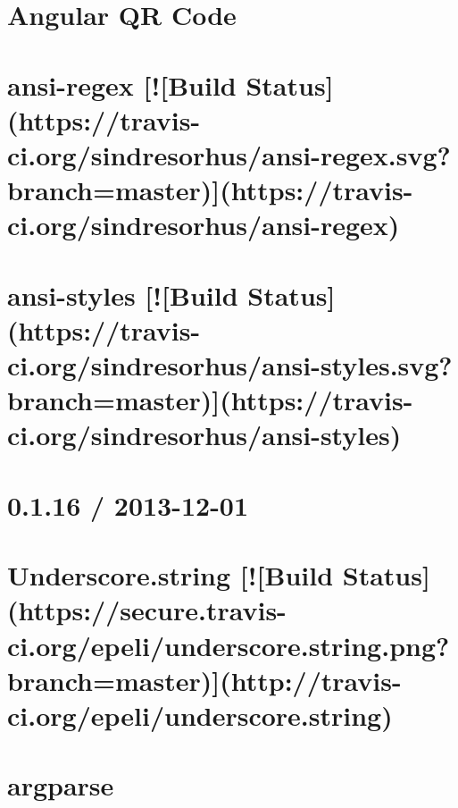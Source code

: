 \documentclass[twoside]{book}
\newcommand{\+}{\discretionary{\mbox{\scriptsize$\hookleftarrow$}}{}{}}
\begin{document}
\chapter{Angular QR Code}
\label{md_app_web_node_modules_angular-qrcode__r_e_a_d_m_e}

\chapter{ansi-\/regex \mbox{[}!\mbox{[}Build Status\mbox{]}(https\+://travis-\/ci.org/sindresorhus/ansi-\/regex.svg?branch=master)\mbox{]}(https\+://travis-\/ci.org/sindresorhus/ansi-\/regex)}
\label{md_app_web_node_modules_ansi-regex_readme}

\chapter{ansi-\/styles \mbox{[}!\mbox{[}Build Status\mbox{]}(https\+://travis-\/ci.org/sindresorhus/ansi-\/styles.svg?branch=master)\mbox{]}(https\+://travis-\/ci.org/sindresorhus/ansi-\/styles)}
\label{md_app_web_node_modules_ansi-styles_readme}

\chapter{0.1.16 / 2013-\/12-\/01}
\label{md_app_web_node_modules_argparse__h_i_s_t_o_r_y}

\chapter{Underscore.\+string \mbox{[}!\mbox{[}Build Status\mbox{]}(https\+://secure.travis-\/ci.org/epeli/underscore.string.\+png?branch=master)\mbox{]}(http\+://travis-\/ci.org/epeli/underscore.string)}
\label{md_app_web_node_modules_argparse_node_modules_underscore_8string__r_e_a_d_m_e}

\chapter{argparse}
\label{md_app_web_node_modules_argparse__r_e_a_d_m_e}

\end{document}
